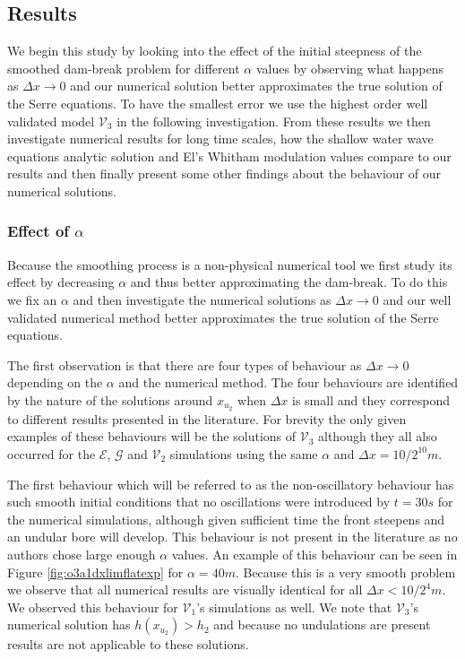 \documentclass[SingleSpace,12pt,Proceedings]{Serre_ASCE}
\begin{document}

\subsection{Results}

We begin this study by looking into the effect of the initial steepness of the smoothed dam-break problem for different $\alpha$ values by observing what happens as $\Delta x \rightarrow 0$ and our numerical solution better approximates the true solution of the Serre equations. To have the smallest error we use the highest order well validated model $\mathcal{V}_3$ in the following investigation. From these results we then investigate numerical results for long time scales, how the shallow water wave equations analytic solution and El's Whitham modulation values compare to our results and then finally present some other findings about the behaviour of our numerical solutions.

\subsubsection{Effect of $\alpha$}
Because the smoothing process is a non-physical numerical tool we first study its effect by decreasing $\alpha$ and thus better approximating the dam-break. To do this we fix an $\alpha$ and then investigate the numerical solutions as $\Delta x \rightarrow 0$ and our well validated numerical method better approximates the true solution of the Serre equations. 

The first observation is that there are four types of behaviour as $\Delta x \rightarrow 0$ depending on the $\alpha$ and the numerical method. The four behaviours are identified by the nature of the solutions around $x_{u_2}$ when $\Delta x$ is small and they correspond to different results presented in the literature. For brevity the only given examples of these behaviours will be the solutions of $\mathcal{V}_3$ although they all also occurred for the $\mathcal{E}$, $\mathcal{G}$ and $\mathcal{V}_2$ simulations using the same $\alpha$ and $\Delta x = 10/2^{10}m$.

The first behaviour which will be referred to as the non-oscillatory behaviour has such smooth initial conditions that no oscillations were introduced by $t= 30s$ for the numerical simulations, although given sufficient time the front steepens and an undular bore will develop. This behaviour is not present in the literature as no authors chose large enough $\alpha$ values. An example of this behaviour can be seen in Figure \ref{fig:o3a1dxlimflatexp} for $\alpha = 40m$. Because this is a very smooth problem we observe that all numerical results are visually identical for all $\Delta x < 10 / 2^4m$. We observed this behaviour for $\mathcal{V}_1$'s simulations as well. We note that $\mathcal{V}_3$'s numerical solution has $h(x_{u_2}) > h_2$ and because no undulations are present  results are not applicable to these solutions.   
\end{document}
